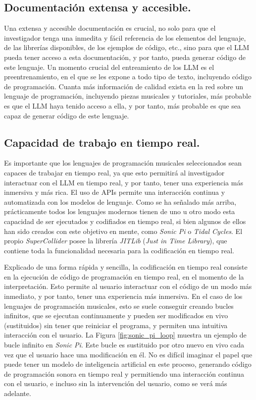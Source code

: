 \subsection{Documentación extensa y accesible.} Una extensa y accesible documentación es crucial, no solo para que el investigador tenga una inmedita y fácil referencia de los elementos del lenguaje, de las librerías disponibles, de los ejemplos de código, etc., sino para que el LLM pueda tener acceso a esta documentación, y por tanto, pueda generar código de este lenguaje. Un momento crucial del entreamiento de los LLM es el preentrenamiento, en el que se les expone a todo tipo de texto, incluyendo código de programación. Cuanta más información de calidad exista en la red sobre un lenguaje de programación, incluyendo piezas musicales y tutoriales, más probable es que el LLM haya tenido acceso a ella, y por tanto, más probable es que sea capaz de generar código de este lenguaje.

\subsection{Capacidad de trabajo en tiempo real.} Es importante que los lenguajes de programación musicales seleccionados sean capaces de trabajar en tiempo real, ya que esto permitirá al investigador interactuar con el LLM en tiempo real, y por tanto, tener una experiencia más inmersiva y más rica. El uso de APIs permite una interacción continua y automatizada con los modelos de lenguaje. Como se ha señalado más arriba, prácticamente todos los lenguajes modernos tienen de uno u otro modo esta capacidad de ser ejecutados y codifiados en tiempo real, si bien algunos de ellos han sido creados con este objetivo en mente, como \textit{Sonic Pi} o \textit{Tidal Cycles}. El propio \textit{SuperCollider} posee la librería \textit{JITLib} (\textit{Just in Time Library}), que contiene toda la funcionalidad necesaria para la codificación en tiempo real.

Explicado de una forma rápida y sencilla, la codificación en tiempo real consiste en la ejecución de código de programación en tiempo real, en el momento de la interpretación. Esto permite al usuario interactuar con el código de un modo más inmediato, y por tanto, tener una experiencia más inmersiva. En el caso de los lenguajes de programación musicales, esto se suele conseguir creando bucles infinitos, que se ejecutan continuamente y pueden ser modificados en vivo (sustituidos) sin tener que reiniciar el programa, y permiten una intuitiva interacción con el usuario. La Figura \ref{fig:sonic_pi_loop} muestra un ejemplo de bucle infinito en \textit{Sonic Pi}. Este bucle es sustituido por otro nuevo en vivo cada vez que el usuario hace una modificación en él. No es difícil imaginar el papel que puede tener un modelo de inteligencia artificial en este proceso, generando código de programación sonora en tiempo real y permitiendo una interacción continua con el usuario, e incluso sin la intervención del usuario, como se verá más adelante.


